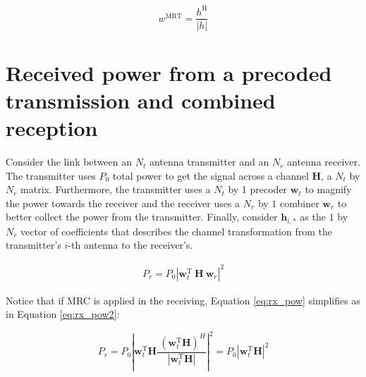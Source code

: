 \begin{equation} \label{eq:mrc}
    w^\text{MRT} = \frac{h^\text{H}}{|h|}
\end{equation}







\section{Received power from a precoded transmission and combined reception}
Consider the link between an $N_t$ antenna transmitter and an $N_r$ antenna receiver. The transmitter uses $P_0$ total power to get the signal across a channel $\bm{H}$, a $N_t$ by $N_r$ matrix. Furthermore, the transmitter uses a $N_t$ by 1 precoder $\bm{w}_t$ to magnify the power towards the receiver and the receiver uses a $N_r$ by $1$ combiner $\bm{w}_r$ to better collect the power from the transmitter. Finally, consider $\bm{h}_{i,*}$ as the $1$ by $N_r$ vector of coefficients that describes the channel transformation from the transmitter's $i$-th antenna to the receiver's.


\begin{align} \label{eq:rx_pow}
    P_r = P_0 \left|\bm{w}_t^\text{T} \ \bm{H} \ \bm{w}_r \right|^2 
\end{align}


\begin{comment}
This is wrong!

    \begin{align}
        
    &= P_0 \sum_{i=1}^{N_t} \left|  \bm{w}_{t_i} \bm{h}_{i,*} \ \bm{w}_r \right|^2 = \\
    &= P_0 \mathlarger{\sum}_{i=1}^{N_t} \left| \bm{w}_{t_i} \right|^2 \sum_{j=1}^{N_r} \left| \bm{h}_{i,j} \ \bm{w}_{r_j} \right|^2 = \\
    &= d
    \end{align}
\end{comment}

Notice that if MRC is applied in the receiving, Equation \eqref{eq:rx_pow} simplifies as in Equation \eqref{eq:rx_pow2}:


\begin{equation} \label{eq:rx_pow2}
    P_r = P_0 \left| \bm{w}_t^\text{T} \bm{H}  \frac{\ \left(\bm{w}_t^\text{T} \bm{H}\right)^H}{\left| \bm{w}_t^\text{T} \bm{H}\right|}\right|^2 = P_0 \left| \bm{w}_t^\text{T} \bm{H}\right|^2
\end{equation}

